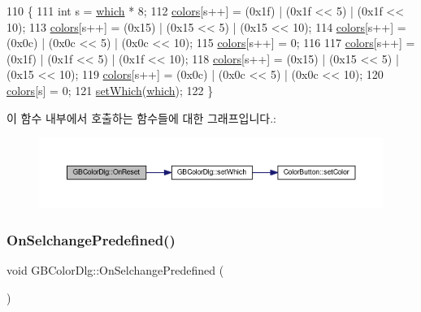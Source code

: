 \begin{DoxyCode}
110 \{
111   \textcolor{keywordtype}{int} s = \mbox{\hyperlink{class_g_b_color_dlg_a8f7bbf1c4a4ffe4a6c57454b9087ff28}{which}} * 8;
112   \mbox{\hyperlink{class_g_b_color_dlg_a24de2e906e28d7b4a006d68d6c8afeee}{colors}}[s++] = (0x1f) | (0x1f << 5) | (0x1f << 10);
113   \mbox{\hyperlink{class_g_b_color_dlg_a24de2e906e28d7b4a006d68d6c8afeee}{colors}}[s++] = (0x15) | (0x15 << 5) | (0x15 << 10);
114   \mbox{\hyperlink{class_g_b_color_dlg_a24de2e906e28d7b4a006d68d6c8afeee}{colors}}[s++] = (0x0c) | (0x0c << 5) | (0x0c << 10);
115   \mbox{\hyperlink{class_g_b_color_dlg_a24de2e906e28d7b4a006d68d6c8afeee}{colors}}[s++] = 0;
116   
117   \mbox{\hyperlink{class_g_b_color_dlg_a24de2e906e28d7b4a006d68d6c8afeee}{colors}}[s++] = (0x1f) | (0x1f << 5) | (0x1f << 10);
118   \mbox{\hyperlink{class_g_b_color_dlg_a24de2e906e28d7b4a006d68d6c8afeee}{colors}}[s++] = (0x15) | (0x15 << 5) | (0x15 << 10);
119   \mbox{\hyperlink{class_g_b_color_dlg_a24de2e906e28d7b4a006d68d6c8afeee}{colors}}[s++] = (0x0c) | (0x0c << 5) | (0x0c << 10);
120   \mbox{\hyperlink{class_g_b_color_dlg_a24de2e906e28d7b4a006d68d6c8afeee}{colors}}[s] = 0;
121   \mbox{\hyperlink{class_g_b_color_dlg_a1e00eaaeaf344a830f1dd5692e26af1d}{setWhich}}(\mbox{\hyperlink{class_g_b_color_dlg_a8f7bbf1c4a4ffe4a6c57454b9087ff28}{which}});
122 \}
\end{DoxyCode}
이 함수 내부에서 호출하는 함수들에 대한 그래프입니다.\+:
\nopagebreak
\begin{figure}[H]
\begin{center}
\leavevmode
\includegraphics[width=350pt]{class_g_b_color_dlg_adab1ec84eb5ffdf0489cfe025d01ea7b_cgraph}
\end{center}
\end{figure}
\mbox{\label{class_g_b_color_dlg_aa2227421c4564023d2ded8198b2194d3}} 
\subsubsection{\texorpdfstring{On\+Selchange\+Predefined()}{OnSelchangePredefined()}}
{\footnotesize\ttfamily void G\+B\+Color\+Dlg\+::\+On\+Selchange\+Predefined (\begin{DoxyParamCaption}{ }\end{DoxyParamCaption})\hspace{0.3cm}{\ttfamily [protected]}}



